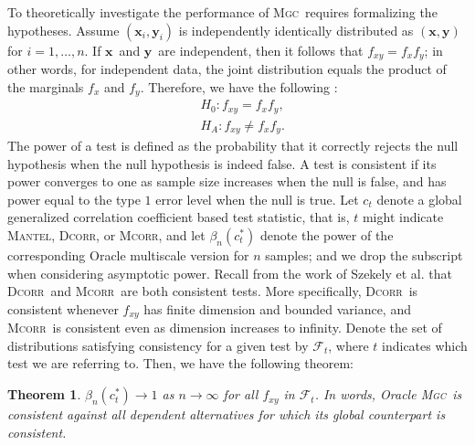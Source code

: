 \documentclass[11pt]{article}
\providecommand{\sct}[1]{{\normalfont\textsc{#1}}}
\providecommand{\mb}[1]{\boldsymbol{#1}}
\providecommand{\mc}[1]{\mathcal{#1}}
\newcommand{\G}{c}
\newcommand{\Mgc}{\sct{Mgc}}
\newcommand{\Dcorr}{\sct{Dcorr}}
\newcommand{\Mcorr}{\sct{Mcorr}}
\newcommand{\Mantel}{\sct{Mantel}}
\newcommand{\mbx}{\ensuremath{\mb{x}}}
\newcommand{\mby}{\ensuremath{\mb{y}}}
\newtheorem{thm}{Theorem}
\begin{document}
To theoretically investigate the performance of \Mgc~requires formalizing the hypotheses. 
Assume $(\mb{x}_i,\mb{y}_i)$ is independently identically distributed as $(\mbx,\mby)$ for $i=1,\ldots,n$. If \mbx~and \mby~are independent, then it  follows that $f_{xy}=f_x f_y$; in other words, for independent data, the joint distribution equals the product of the marginals $f_x$ and $f_y$.  Therefore, we have the following :
\begin{align*}
& H_{0}: f_{xy}=f_{x}f_{y},\\
& H_{A}: f_{xy} \neq f_{x}f_{y}.
\end{align*}
The power of a test is defined as the probability that it correctly rejects the null hypothesis when the null hypothesis is indeed false.
A test is consistent if its power converges to one as sample size increases when the null is false, and has power equal to the type $1$ error level when the null is true.
Let $\G_t$ denote a global generalized correlation coefficient based test statistic, that is, $t$ might indicate \Mantel, \Dcorr, or \Mcorr, and let $\beta_n(\G_t^*)$ denote the power of the corresponding Oracle multiscale version for $n$ samples; and we drop the subscript when considering asymptotic power.
Recall from the work of Szekely et al. that \Dcorr~and \Mcorr~are both consistent tests. More specifically, \Dcorr~is consistent whenever $f_{xy}$ has finite dimension and bounded variance, and \Mcorr~is consistent even as dimension increases to infinity.  Denote the set of distributions satisfying consistency for a given test by $\mc{F}_t$, where $t$ indicates which test we are referring to. Then, we have the following theorem:
\begin{thm}
\label{thm1}
$\beta_n(\G_t^*) \rightarrow 1$ as $n \to \infty$ for all $f_{xy}$ in $\mc{F}_t$.
In words, Oracle \Mgc~is consistent against all dependent alternatives for which its global counterpart is consistent. 
\end{thm}
\end{document}
